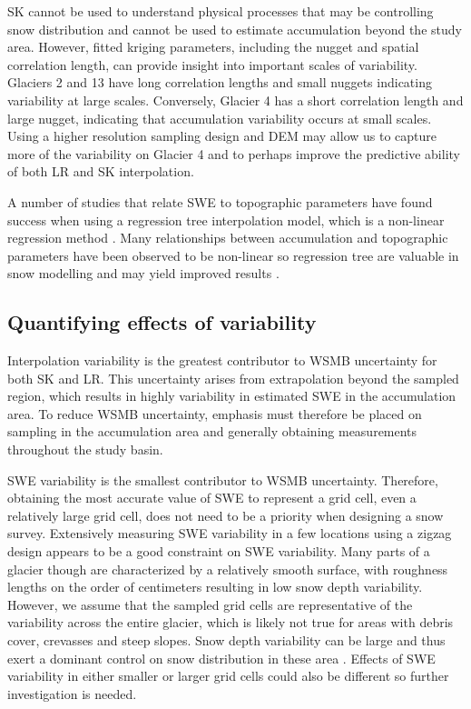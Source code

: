 \documentclass[review,oneside, letterpaper]{igs}
\begin{document}
SK cannot be used to understand physical processes that may be controlling snow distribution and cannot be used to estimate accumulation beyond the study area. However, fitted kriging parameters, including the nugget and spatial correlation length, can provide insight into important scales of variability. Glaciers 2 and 13 have long correlation lengths and small nuggets indicating variability at large scales. Conversely, Glacier 4 has a short correlation length and large nugget, indicating that accumulation variability occurs at small scales. Using a higher resolution sampling design and DEM may allow us to capture more of the variability on Glacier 4 and to perhaps improve the predictive ability of both LR and SK interpolation. 

A number of studies that relate SWE to topographic parameters have found success when using a regression tree interpolation model, which is a non-linear regression method \citep[e.g.][]{Elder1998, Erickson2005, Lopez2010}. Many relationships between accumulation and topographic parameters have been observed to be non-linear so regression tree are valuable in snow modelling and may yield improved results \citep{Erxleben2002, Molotch2005}. 




\subsection{Quantifying effects of variability}

Interpolation variability is the greatest contributor to WSMB uncertainty for both SK and LR. This uncertainty arises from extrapolation beyond the sampled region, which results in highly variability in estimated SWE in the accumulation area. To reduce WSMB uncertainty, emphasis must therefore be placed on sampling in the accumulation area and generally obtaining measurements throughout the study basin. 

SWE variability is the smallest contributor to WSMB uncertainty. Therefore, obtaining the most accurate value of SWE to represent a grid cell, even a relatively large grid cell, does not need to be a priority when designing a snow survey. Extensively measuring SWE variability in a few locations using a zigzag design appears to be a good constraint on SWE variability. Many parts of a glacier though are characterized by a relatively smooth surface, with roughness lengths on the order of centimeters \citep{Hock2005} resulting in low snow depth variability. However, we assume that the sampled grid cells are representative of the variability across the entire glacier, which is likely not true for areas with debris cover, crevasses and steep slopes. Snow depth variability can be large and thus exert a dominant control on snow distribution in these area \citep{McGrath2015}. Effects of SWE variability in either smaller or larger grid cells could also be different so further investigation is needed.
\end{document}
